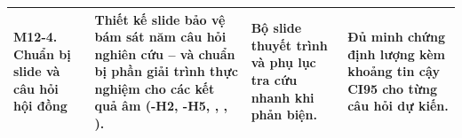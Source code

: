 \begin{table}[H]
\begin{tabularx}{\linewidth}{|>{\raggedright\arraybackslash}p{2.7cm}|Y|>{\raggedright\arraybackslash}p{3.6cm}|>{\raggedright\arraybackslash}p{3.4cm}|}
    \hline
    \textbf{M12-4.} Chuẩn bị slide và câu hỏi hội đồng & Thiết kế slide bảo vệ bám sát năm câu hỏi nghiên cứu -- và chuẩn bị phần giải trình thực nghiệm cho các kết quả âm (\hyp{H2}, \hyp{H5}, , , ). & Bộ slide thuyết trình và phụ lục tra cứu nhanh khi phản biện. & Đủ minh chứng định lượng kèm khoảng tin cậy CI95 cho từng câu hỏi dự kiến. \\
    \hline
  \end{tabularx}
\end{table}
